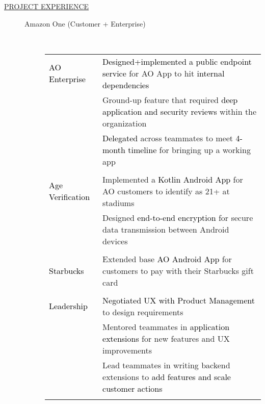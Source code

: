 \documentclass[11pt]{article}
\begin{document}
\begin{description}
        \item[\underline{PROJECT EXPERIENCE}] \hfill
            \begin{description}
                \item[Amazon One (Customer + Enterprise)]\hfill \\
                \textcolor{gray}{
                    \begin{tabular}{l|l}
                        \\[-1.0mm]
                        \textcolor{black}{AO Enterprise}
                            & \textcolor{black}{Designed+implemented a public endpoint service} for AO App to hit \textcolor{black}{internal dependencies} \\
                            & Ground-up feature that required \textcolor{black}{deep application and security reviews} within the organization \\
                            & \textcolor{black}{Delegated} across teammates to meet \textcolor{black}{4-month timeline} for bringing up a working app\\
                        \\[-1.7mm]
                        \textcolor{black}{Age Verification}
                            & Implemented a \textcolor{black}{Kotlin Android App} for AO customers to identify as 21+ at stadiums\\
                            & Designed \textcolor{black}{end-to-end encryption} for secure data transmission between Android devices\\
                        \\[-1.7mm]
                        \textcolor{black}{Starbucks}
                            & Extended base \textcolor{black}{AO Android App} for customers to pay with their Starbucks gift card\\
                        \\[-1.0mm]
                        \textcolor{black}{Leadership}
                            & \textcolor{black}{Negotiated UX with Product Management} to design requirements \\
                            & Mentored teammates in \textcolor{black}{application extensions} for new features and UX improvements\\
                            & Lead teammates in writing backend extensions to \textcolor{black}{add features and scale customer actions}\\
                        \\[-1.0mm]
                    \end{tabular}
                }


\end{description}
\end{description}
\end{document}
